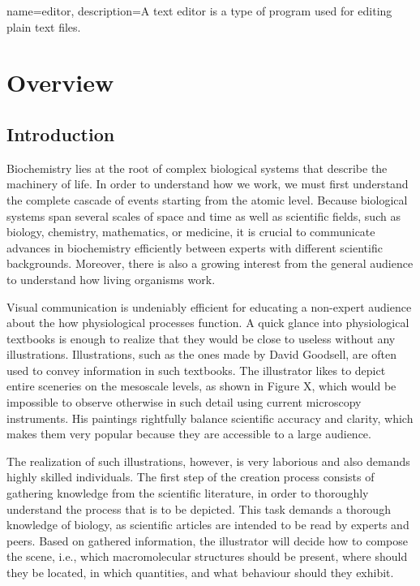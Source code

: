 
{
	name={editor},
	description={A text editor is a type of program used for editing plain text files.}
}

\chapter{Overview}

\section{Introduction}

Biochemistry lies at the root of complex biological systems that describe the machinery of life.
In order to understand how we work, we must first understand the complete cascade of events starting from the atomic level.
Because biological systems span several scales of space and time as well as scientific fields, such as biology, chemistry, mathematics, or medicine, it is crucial to communicate advances in biochemistry efficiently between experts with different scientific backgrounds.
Moreover, there is also a growing interest from the general audience to understand how living organisms work.

Visual communication is undeniably efficient for educating a non-expert audience about the how physiological processes function.
A quick glance into physiological textbooks is enough to realize that they would be close to useless without any illustrations.
Illustrations, such as the ones made by David Goodsell, are often used to convey information in such textbooks.
The illustrator likes to depict entire sceneries on the mesoscale levels, as shown in Figure X, which would be impossible to observe otherwise in such detail using current microscopy instruments.
His paintings rightfully balance scientific accuracy and clarity, which makes them very popular because they are accessible to a large audience.
 
The realization of such illustrations, however, is very laborious and also demands highly skilled individuals.
The first step of the creation process consists of gathering knowledge from the scientific literature, in order to thoroughly understand the process that is to be depicted.
This task demands a thorough knowledge of biology, as scientific articles are intended to be read by experts and peers.
Based on gathered information, the illustrator will decide how to compose the scene, i.e., which macromolecular structures should be present, where should they be located, in which quantities, and what behaviour should they exhibit.

